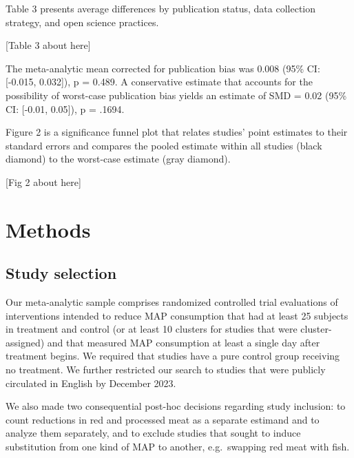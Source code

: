 \documentclass[sn-nature,referee,pdflatex]{sn-jnl}
\begin{document}
Table 3 presents average differences by publication status, data
collection strategy, and open science practices.

\begin{center}
[Table 3 about here]
\end{center}

The meta-analytic mean corrected for publication bias \citep{hedges1992}
was 0.008 (95\% CI: {[}-0.015, 0.032{]}), p = 0.489. A conservative
estimate that accounts for the possibility of worst-case publication
bias \citep{mathur2024} yields an estimate of SMD = 0.02 (95\% CI:
{[}-0.01, 0.05{]}), p = .1694.

Figure 2 is a significance funnel plot \citep{mathur2020} that relates
studies' point estimates to their standard errors and compares the
pooled estimate within all studies (black diamond) to the worst-case
estimate (gray diamond).

\begin{center}
[Fig 2 about here]
\end{center}

\section{Methods}\label{sec3}

\subsection{Study selection}\label{sec3.1}

Our meta-analytic sample comprises randomized controlled trial
evaluations of interventions intended to reduce MAP consumption that had
at least 25 subjects in treatment and control (or at least 10 clusters
for studies that were cluster-assigned) and that measured MAP
consumption at least a single day after treatment begins. We required
that studies have a pure control group receiving no treatment. We
further restricted our search to studies that were publicly circulated
in English by December 2023.

We also made two consequential post-hoc decisions regarding study
inclusion: to count reductions in red and processed meat as a separate
estimand and to analyze them separately, and to exclude studies that
sought to induce substitution from one kind of MAP to another,
e.g.~swapping red meat with fish.
\end{document}
